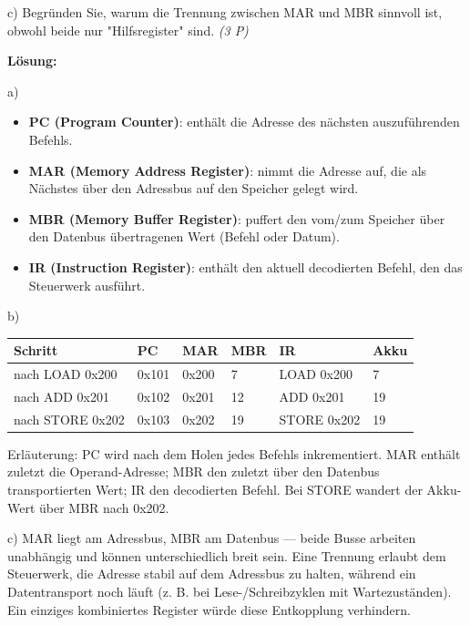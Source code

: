 \documentclass[11pt, a4paper]{article}
\begin{document}
c) Begründen Sie, warum die Trennung zwischen MAR und MBR sinnvoll ist, obwohl beide nur "Hilfsregister" sind. \textit{(3 P)}


\textbf{Lösung:}


a)

\begin{itemize}
  \item \textbf{PC (Program Counter)}: enthält die Adresse des nächsten auszuführenden Befehls.
  \item \textbf{MAR (Memory Address Register)}: nimmt die Adresse auf, die als Nächstes über den Adressbus auf den Speicher gelegt wird.
  \item \textbf{MBR (Memory Buffer Register)}: puffert den vom/zum Speicher über den Datenbus übertragenen Wert (Befehl oder Datum).
  \item \textbf{IR (Instruction Register)}: enthält den aktuell decodierten Befehl, den das Steuerwerk ausführt.
\end{itemize}

b)



{\small
\begin{tabularx}{\linewidth}{XXXXXX}
\hline
\rowcolor{tableheadbg}
{\color{white}\textbf{Schritt}} & {\color{white}\textbf{PC}} & {\color{white}\textbf{MAR}} & {\color{white}\textbf{MBR}} & {\color{white}\textbf{IR}} & {\color{white}\textbf{Akku}} \\[2pt]
\hline
\endhead
\hline
\endfoot
nach LOAD 0x200 & 0x101 & 0x200 & 7 & LOAD 0x200 & 7 \\
nach ADD  0x201 & 0x102 & 0x201 & 12 & ADD 0x201 & 19 \\
nach STORE 0x202 & 0x103 & 0x202 & 19 & STORE 0x202 & 19 \\
\end{tabularx}
}


Erläuterung: PC wird nach dem Holen jedes Befehls inkrementiert. MAR enthält zuletzt die Operand-Adresse; MBR den zuletzt über den Datenbus transportierten Wert; IR den decodierten Befehl. Bei STORE wandert der Akku-Wert über MBR nach 0x202.


c) MAR liegt am Adressbus, MBR am Datenbus — beide Busse arbeiten unabhängig und können unterschiedlich breit sein. Eine Trennung erlaubt dem Steuerwerk, die Adresse stabil auf dem Adressbus zu halten, während ein Datentransport noch läuft (z. B. bei Lese-/Schreibzyklen mit Wartezuständen). Ein einziges kombiniertes Register würde diese Entkopplung verhindern.
\end{document}

